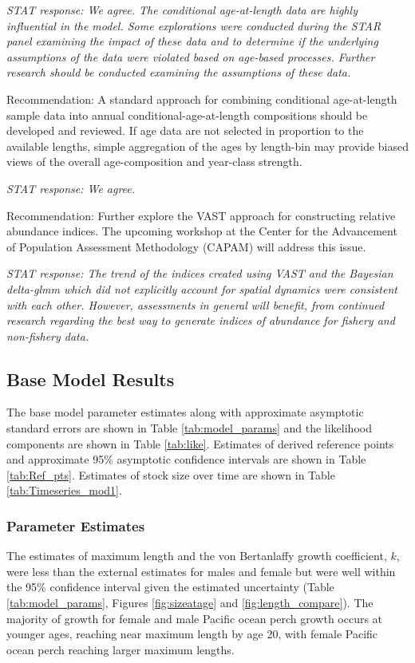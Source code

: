\documentclass[12pt,]{article}
\begin{document}
\emph{STAT response: We agree. The conditional age-at-length data are
highly influential in the model. Some explorations were conducted during
the STAR panel examining the impact of these data and to determine if
the underlying assumptions of the data were violated based on age-based
processes. Further research should be conducted examining the
assumptions of these data.}

Recommendation: A standard approach for combining conditional
age-at-length sample data into annual conditional-age-at-length
compositions should be developed and reviewed. If age data are not
selected in proportion to the available lengths, simple aggregation of
the ages by length-bin may provide biased views of the overall
age-composition and year-class strength.

\emph{STAT response: We agree.}

Recommendation: Further explore the VAST approach for constructing
relative abundance indices. The upcoming workshop at the Center for the
Advancement of Population Assessment Methodology (CAPAM) will address
this issue.

\emph{STAT response: The trend of the indices created using VAST and the
Bayesian delta-glmm which did not explicitly account for spatial
dynamics were consistent with each other. However, assessments in
general will benefit, from continued research regarding the best way to
generate indices of abundance for fishery and non-fishery data.}

\subsection{Base Model Results}\label{base-model-results}

The base model parameter estimates along with approximate asymptotic
standard errors are shown in Table \ref{tab:model_params} and the
likelihood components are shown in Table \ref{tab:like}. Estimates of
derived reference points and approximate 95\% asymptotic confidence
intervals are shown in Table \ref{tab:Ref_pts}. Estimates of stock size
over time are shown in Table \ref{tab:Timeseries_mod1}.

\subsubsection{Parameter Estimates}\label{parameter-estimates}

The estimates of maximum length and the von Bertanlaffy growth
coefficient, \(k\), were less than the external estimates for males and
female but were well within the 95\% confidence interval given the
estimated uncertainty (Table \ref{tab:model_params}, Figures
\ref{fig:sizeatage} and \ref{fig:length_compare}). The majority of
growth for female and male Pacific ocean perch growth occurs at younger
ages, reaching near maximum length by age 20, with female Pacific ocean
perch reaching larger maximum lengths.
\end{document}
